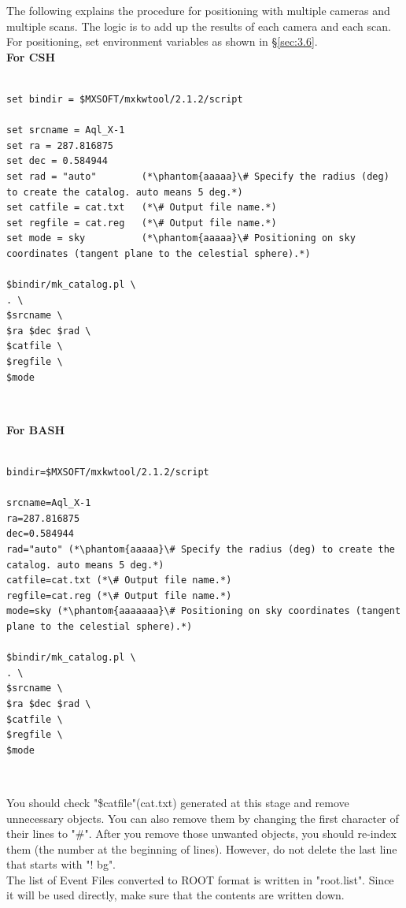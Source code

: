 \documentclass[10pt]{report}
\renewcommand{\_}{\textscale{.5}{\textbf{\textunderscore}}}
\begin{document}
The following explains the procedure for positioning with multiple cameras and multiple scans. The logic is to add up the results of each camera and each scan. For positioning, set environment variables as shown in \S\ref{sec:3.6}. \\

\noindent\textbf{For CSH} \\

\begin{lstlisting}[frame=single]

set bindir = $MXSOFT/mxkwtool/2.1.2/script

set srcname = Aql_X-1
set ra = 287.816875
set dec = 0.584944
set rad = "auto"        (*\phantom{aaaaa}\# Specify the radius (deg) to create the catalog. auto means 5 deg.*)
set catfile = cat.txt   (*\# Output file name.*)
set regfile = cat.reg   (*\# Output file name.*)
set mode = sky          (*\phantom{aaaaa}\# Positioning on sky coordinates (tangent plane to the celestial sphere).*)

$bindir/mk_catalog.pl \
. \
$srcname \
$ra $dec $rad \
$catfile \
$regfile \
$mode

\end{lstlisting}

\

\noindent\textbf{For BASH} \\

\begin{lstlisting}[frame=single]

bindir=$MXSOFT/mxkwtool/2.1.2/script

srcname=Aql_X-1
ra=287.816875
dec=0.584944
rad="auto" (*\phantom{aaaaa}\# Specify the radius (deg) to create the catalog. auto means 5 deg.*)
catfile=cat.txt (*\# Output file name.*)
regfile=cat.reg (*\# Output file name.*)
mode=sky (*\phantom{aaaaaaa}\# Positioning on sky coordinates (tangent plane to the celestial sphere).*)

$bindir/mk_catalog.pl \
. \
$srcname \
$ra $dec $rad \
$catfile \
$regfile \
$mode

\end{lstlisting}

\

You should check "\$catfile"(cat.txt) generated at this stage and remove unnecessary objects. You can also remove them by changing the first character of their lines to "\#". After you remove those unwanted objects, you should re-index them (the number at the beginning of lines). However, do not delete the last line that starts with "! bg".\\
\indent The list of Event Files converted to ROOT format is written in "root.list". Since it will be used directly, make sure that the contents are written down. \\
\end{document}
